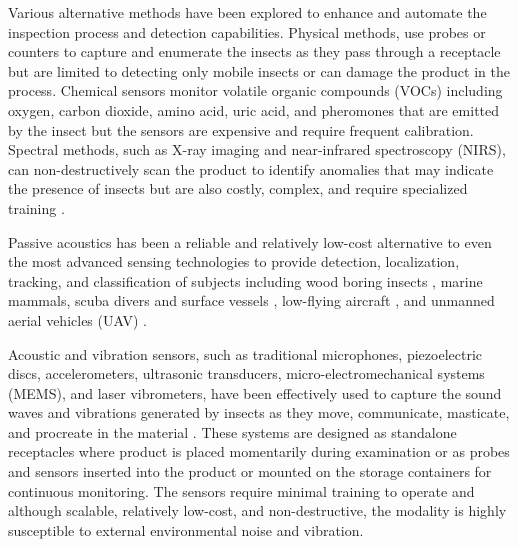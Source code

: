 \documentclass[../Vibro-Acoustic Signatures and Detection Algorithms for Stored Product Insects.tex]{subfiles}
\begin{document}
Various alternative methods have been explored to enhance and automate the inspection process and detection capabilities. Physical methods, use probes or counters to capture and enumerate the insects as they pass through a receptacle but are limited to detecting only mobile insects or can damage the product in the process. Chemical sensors monitor volatile organic compounds (VOCs) including oxygen, carbon dioxide, amino acid, uric acid, and pheromones that are emitted by the insect but the sensors are expensive and require frequent calibration. Spectral methods, such as X-ray imaging and near-infrared spectroscopy (NIRS), can non-destructively scan the product to identify anomalies that may indicate the presence of insects but are also costly, complex, and require specialized training \cite{muller-blenkleMethodAcousticStorage2023}.

Passive acoustics has been a reliable and relatively low-cost alternative to even the most advanced sensing technologies to provide detection, localization, tracking, and classification of subjects including wood boring insects \cite{flynnAcousticMethodsInvasive2016, sutinVibroacousticMethodsInsect2017, sutinAutomatedAcousticDetection2019}, marine mammals, scuba divers and surface vessels \cite{sutinStevensPassiveAcoustic2010, sutinStevensPassiveAcoustic2013, pollaraPassiveAcousticMethods2017, sedunovLowSizeCostAcoustic2022, salloumLowcostMultimodalIntegrated2022, sedunovStevensPassiveAcoustic2022a}, low-flying aircraft \cite{sutinAcousticDetectionTracking2013, sedunovPassiveAcousticLocalization2013}, and unmanned aerial vehicles (UAV) \cite{yakubovskiyFeatureExtractionAcoustic2015, salloumAcousticSystemLow2015, sedunovUAVPassiveAcoustic2018, sedunovStevensDroneDetection2019,kadyrovImprovementsStevensDrone2022}. 

Acoustic and vibration sensors, such as traditional microphones, piezoelectric discs, accelerometers, ultrasonic transducers, micro-electromechanical systems (MEMS), and laser vibrometers, have been effectively used to capture the sound waves and vibrations generated by insects as they move, communicate, masticate, and procreate in the material \cite{mankinPerspectivePromiseCentury2011}. These systems are designed as standalone receptacles where product is placed momentarily during examination or as probes and sensors inserted into the product or mounted on the storage containers for continuous monitoring. The sensors require minimal training to operate and although scalable, relatively low-cost, and non-destructive, the modality is highly susceptible to external environmental noise and vibration. 
\end{document}
